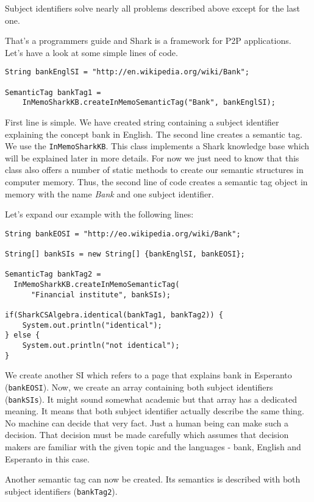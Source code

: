 Subject identifiers solve nearly all problems described above except for the last one.

That's a programmers guide and Shark is a framework for P2P applications. Let's
have a look at some simple lines of code.

\begin{verbatim}
String bankEnglSI = "http://en.wikipedia.org/wiki/Bank";

SemanticTag bankTag1 =
    InMemoSharkKB.createInMemoSemanticTag("Bank", bankEnglSI);
\end{verbatim}

First line is simple. We have created string containing a subject identifier explaining the concept bank in English. The second line creates a semantic tag.
We use the {\tt InMemoSharkKB}. This class implements a Shark knowledge base which will be explained later in more details. For now we just need to know that this class also offers a number of static methods to create our semantic structures in computer memory. Thus, the second line of code creates a semantic tag object in memory with the name {\it Bank} and one subject identifier.

Let's expand our example with the following lines:

\begin{verbatim}
String bankEOSI = "http://eo.wikipedia.org/wiki/Bank";

String[] bankSIs = new String[] {bankEnglSI, bankEOSI};

SemanticTag bankTag2 =
  InMemoSharkKB.createInMemoSemanticTag(
      "Financial institute", bankSIs);

if(SharkCSAlgebra.identical(bankTag1, bankTag2)) {
    System.out.println("identical");
} else {
    System.out.println("not identical");
}
\end{verbatim}

We create another SI which refers to a page that explains bank in Esperanto ({\tt bankEOSI}).
Now, we create an array containing both subject identifiers ({\tt bankSIs}).
It might sound somewhat academic but that array has a dedicated meaning.
It means that both subject identifier actually describe the same thing.
No machine can decide that very fact. Just a human being can make such a decision. That decision must be made carefully
which assumes that decision makers are familiar with the given topic and
the languages - bank, English and Esperanto in this case.

Another semantic tag can now be created. Its semantics is described with both subject identifiers ({\tt bankTag2}).

